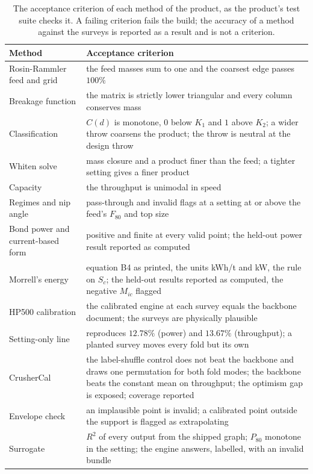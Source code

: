 \begin{table}[!t]
\centering
\caption{The acceptance criterion of each method of the product, as the product's test suite checks it. A failing criterion fails the build;
the accuracy of a method against the surveys is reported as a result and is not a criterion.}
\label{tab:acceptance}
\footnotesize
\begin{tabular}{@{}p{} p{}@{}}
\toprule
Method & Acceptance criterion \\
\midrule
Rosin-Rammler feed and grid & the feed masses sum to one and the coarsest edge passes $100\%$ \\
Breakage function & the matrix is strictly lower triangular and every column conserves mass \\
Classification & $C(d)$ is monotone, $0$ below $K_1$ and $1$ above $K_2$; a wider throw coarsens the product; the throw is neutral at the design throw \\
Whiten solve & mass closure and a product finer than the feed; a tighter setting gives a finer product \\
Capacity & the throughput is unimodal in speed \\
Regimes and nip angle & pass-through and invalid flags at a setting at or above the feed's $F_{80}$ and top size \\
Bond power and current-based form & positive and finite at every valid point; the held-out power result reported as computed \\
Morrell's energy & equation B4 as printed, the units kWh/t and kW, the rule on $S_c$; the held-out results reported as computed, the negative $M_{ic}$ flagged \\
HP500 calibration & the calibrated engine at each survey equals the backbone document; the surveys are physically plausible \\
Setting-only line & reproduces $12.78\%$ (power) and $13.67\%$ (throughput); a planted survey moves every fold but its own \\
CrusherCal & the label-shuffle control does not beat the backbone and draws one permutation for both fold modes; the backbone beats the constant mean on throughput; the optimism gap is exposed; coverage reported \\
Envelope check & an implausible point is invalid; a calibrated point outside the support is flagged as extrapolating \\
Surrogate & $R^2$ of every output from the shipped graph; $P_{80}$ monotone in the setting; the engine answers, labelled, with an invalid bundle \\

\end{tabular}
\end{table}

